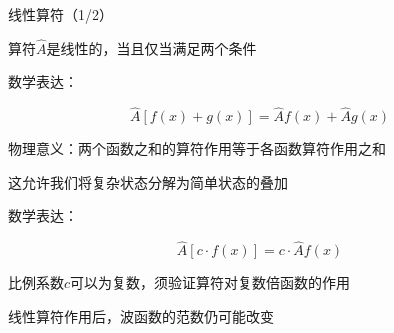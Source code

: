 \begin{frame}{线性算符（1/2）}
  
  
    \begin{iqbitemize}
    \item 算符$\hat{A}$是线性的，当且仅当满足两个条件
    \end{iqbitemize}
    \iqbsmallsep

    \begin{iqbitemize}
    \item 数学表达：
    \end{iqbitemize}
      \[
        \hat{A}[f(x) + g(x)] = \hat{A}f(x) + \hat{A}g(x)
      \]
    \begin{iqbitemize}
    \item 物理意义：两个函数之和的算符作用等于各函数算符作用之和
    \item 这允许我们将复杂状态分解为简单状态的叠加
    \end{iqbitemize}
    \iqbsmallsep

    \begin{iqbitemize}
    \item 数学表达：
    \end{iqbitemize}
      \[
        \hat{A}[c \cdot f(x)] = c \cdot \hat{A}f(x)
      \]
    \begin{iqbitemize}
    \item 比例系数$c$可以为复数，须验证算符对复数倍函数的作用
    \item 线性算符作用后，波函数的范数仍可能改变
    \end{iqbitemize}
  
\end{frame}

